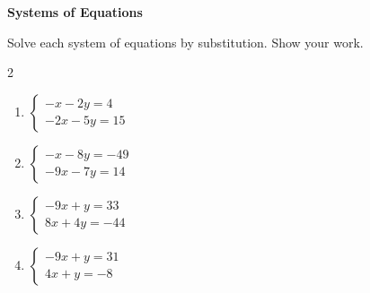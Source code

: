 \documentclass[11pt,letterpaper]{article}
\begin{document}
\begin{center}
  {\Large \textbf{Systems of Equations}}
\end{center}

\vspace{0.5em}
\noindent Solve each system of equations by substitution. Show your work.
\vspace{1em}

\begin{multicols}{2}
\begin{enumerate}[itemsep=2.2em, leftmargin=*]
  \item $\begin{cases}-x - 2y = 4\\-2x - 5y = 15\end{cases}$
    \vspace{2.2em}
  \item $\begin{cases}-x - 8y = -49\\-9x - 7y = 14\end{cases}$
    \vspace{2.2em}
  \item $\begin{cases}-9x + y = 33\\8x + 4y = -44\end{cases}$
    \vspace{2.2em}
  \item $\begin{cases}-9x + y = 31\\4x + y = -8\end{cases}$
    \vspace{2.2em}
\end{enumerate}
\end{multicols}
\end{document}
